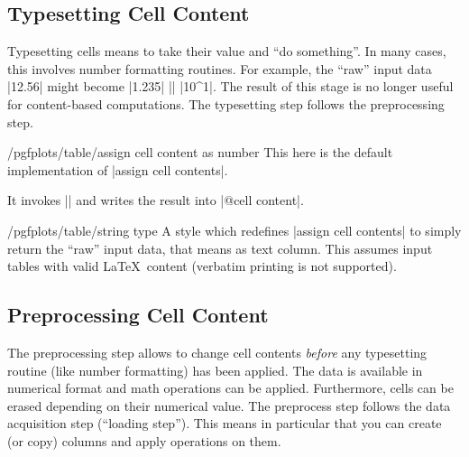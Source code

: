 \subsection{Typesetting Cell Content}
Typesetting cells means to take their value and ``do something''. In many cases, this involves number formatting routines. For example, the ``raw'' input data |12.56| might become |1.235| |\cdot| |10^1|. The result of this stage is no longer useful for content-based computations. The typesetting step follows the preprocessing step.


\begin{key}{/pgfplots/table/assign cell content as number}
	This here is the default implementation of |assign cell contents|. 
	
	It invokes |\pgfmathprintnumberto| and writes the result into |@cell content|.
\end{key}

\begin{stylekey}{/pgfplots/table/string type}
	A style which redefines |assign cell contents| to simply return the ``raw'' input data, that means as text column. This assumes input tables with valid \LaTeX\ content (verbatim printing is not supported).
\end{stylekey}


\subsection{Preprocessing Cell Content}
The preprocessing step allows to change cell contents \emph{before} any typesetting routine (like number formatting) has been applied. The data is available in numerical format and math operations can be applied. Furthermore, cells can be erased depending on their numerical value. The preprocess step follows the data acquisition step (``loading step''). This means in particular that you can create (or copy) columns and apply operations on them.

